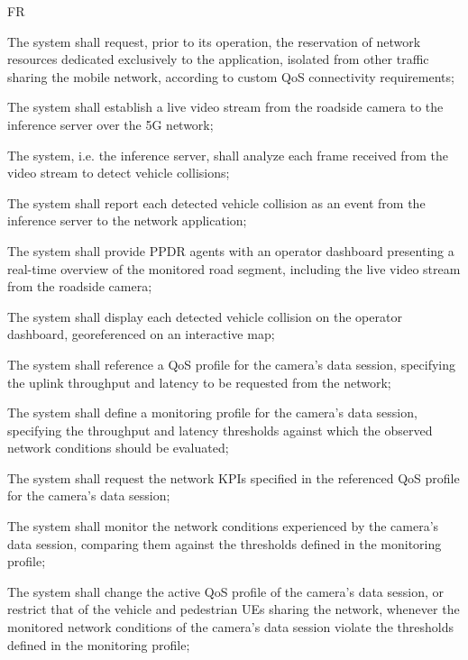\begin{custenumerate}{FR}
    \item \label{enum:fr:slice} The system shall request, prior to its operation, the reservation of network resources dedicated exclusively to the application, isolated from other traffic sharing the mobile network, according to custom \acs{QoS} connectivity requirements;
    \item \label{enum:fr:stream} The system shall establish a live video stream from the roadside camera to the inference server over the \acs{5G} network;
    \item \label{enum:fr:detection} The system, i.e. the inference server, shall analyze each frame received from the video stream to detect vehicle collisions;
    \item \label{enum:fr:detection-event} The system shall report each detected vehicle collision as an event from the inference server to the network application;
    \item \label{enum:fr:dashboard} The system shall provide \acs{PPDR} agents with an operator dashboard presenting a real-time overview of the monitored road segment, including the live video stream from the roadside camera;
    \item \label{enum:fr:dashboard-collisions} The system shall display each detected vehicle collision on the operator dashboard, georeferenced on an interactive map;
    \item \label{enum:fr:qos-profile} The system shall reference a \acs{QoS} profile for the camera's data session, specifying the uplink throughput and latency to be requested from the network;
    \item \label{enum:fr:monitoring-profile} The system shall define a monitoring profile for the camera's data session, specifying the throughput and latency thresholds against which the observed network conditions should be evaluated;
    \item \label{enum:fr:qos-request} The system shall request the network \acsp{KPI} specified in the referenced \acs{QoS} profile for the camera's data session;
    \item \label{enum:fr:monitoring} The system shall monitor the network conditions experienced by the camera's data session, comparing them against the thresholds defined in the monitoring profile;
    \item \label{enum:fr:qos-change} The system shall change the active \acs{QoS} profile of the camera's data session, or restrict that of the vehicle and pedestrian \acsp{UE} sharing the network, whenever the monitored network conditions of the camera's data session violate the thresholds defined in the monitoring profile;

\end{custenumerate}
